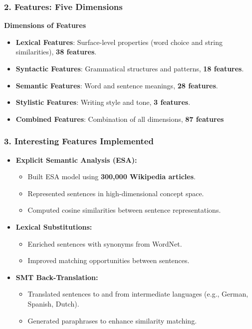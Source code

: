 \documentclass{beamer}
\begin{document}
\begin{frame}
  \frametitle{2. Features: Five Dimensions}
  \begin{center}
    \textbf{Dimensions of Features}
    \begin{itemize}
      \item \textbf{Lexical Features}: Surface-level properties (word choice and string similarities), \textbf{38 features}.
      \item \textbf{Syntactic Features}: Grammatical structures and patterns, \textbf{18 features}.
      \item \textbf{Semantic Features}: Word and sentence meanings, \textbf{28 features}.
      \item \textbf{Stylistic Features}: Writing style and tone, \textbf{3 features}.
      \item \textbf{Combined Features}: Combination of all dimensions, \textbf{87 features}
    \end{itemize}
  \end{center}
\end{frame}




\begin{frame}
  \frametitle{3. Interesting Features Implemented}
  \begin{itemize}
    \item \textbf{Explicit Semantic Analysis (ESA):}
    \begin{itemize}
      \item Built ESA model using \textbf{300,000 Wikipedia articles}.
      \item Represented sentences in high-dimensional concept space.
      \item Computed cosine similarities between sentence representations.
    \end{itemize}
    \vspace{0.5cm}
    \item \textbf{Lexical Substitutions:}
    \begin{itemize}
      \item Enriched sentences with synonyms from WordNet.
      \item Improved matching opportunities between sentences.
    \end{itemize}
    \vspace{0.5cm}
    \item \textbf{SMT Back-Translation:}
    \begin{itemize}
      \item Translated sentences to and from intermediate languages (e.g., German, Spanish, Dutch).
      \item Generated paraphrases to enhance similarity matching.
    \end{itemize}
  \end{itemize}
\end{frame}
\end{document}
